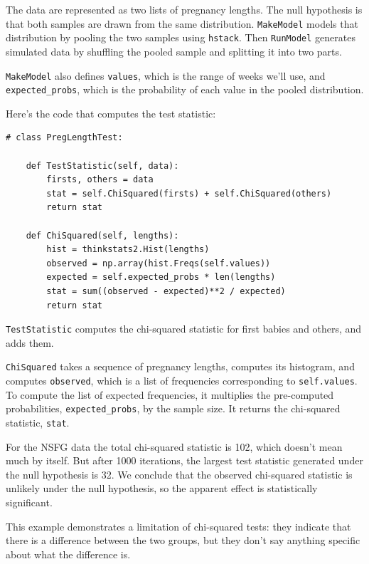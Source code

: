\documentclass[12pt]{book}
\begin{document}
The data are represented as two lists of pregnancy lengths.  The null
hypothesis is that both samples are drawn from the same distribution.
\verb"MakeModel" models that distribution by pooling the two
samples using \verb"hstack".  Then \verb"RunModel" generates
simulated data by shuffling the pooled sample and splitting it
into two parts.

\verb"MakeModel" also defines \verb"values", which is the
range of weeks we'll use, and \verb"expected_probs",
which is the probability of each value in the pooled distribution.

Here's the code that computes the test statistic:

\begin{verbatim}
# class PregLengthTest:

    def TestStatistic(self, data):
        firsts, others = data
        stat = self.ChiSquared(firsts) + self.ChiSquared(others)
        return stat

    def ChiSquared(self, lengths):
        hist = thinkstats2.Hist(lengths)
        observed = np.array(hist.Freqs(self.values))
        expected = self.expected_probs * len(lengths)
        stat = sum((observed - expected)**2 / expected)
        return stat
\end{verbatim}

\verb"TestStatistic" computes the chi-squared statistic for
first babies and others, and adds them.

\verb"ChiSquared" takes a sequence of pregnancy lengths, computes
its histogram, and computes \verb"observed", which is a list of
frequencies corresponding to \verb"self.values".
To compute the list of expected frequencies, it multiplies the
pre-computed probabilities, \verb"expected_probs", by the sample
size.  It returns the chi-squared statistic, \verb"stat".

For the NSFG data the total chi-squared statistic is 102, which
doesn't mean much by itself.  But after 1000 iterations, the largest
test statistic generated under the null hypothesis is 32.  We conclude
that the observed chi-squared statistic is unlikely under the null
hypothesis, so the apparent effect is statistically significant.
 

This example demonstrates a limitation of chi-squared tests: they
indicate that there is a difference between the two groups,
but they don't say anything specific about what the difference is.
\end{document}
